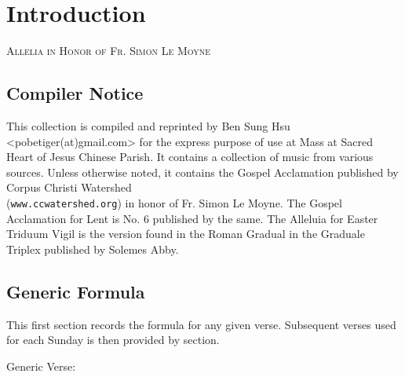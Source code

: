 \documentclass[11pt,oneside]{book} %
\begin{document}

\renewcommand*\contentsname{\textsc{Table of Contents}}
\tableofcontents


\mainmatter

\chapter{Introduction}
\begin{center}\begin{huge}
\textsc{Allelia in Honor of Fr. Simon Le Moyne}
\end{huge}\end{center}

\section{Compiler Notice}
\begin{paragraph}
This collection is compiled and reprinted by Ben Sung Hsu
<pobetiger(at)gmail.com> for the express purpose of use at 
Mass at Sacred Heart of Jesus Chinese Parish. It contains a collection
of music from various sources. Unless otherwise noted, it contains
the Gospel Acclamation published by Corpus Christi Watershed \\
(\texttt{www.ccwatershed.org}) in honor of Fr. Simon Le Moyne. 
The Gospel Acclamation for Lent is No. 6 published by the same.
The Alleluia for Easter Triduum Vigil is the version found in the
Roman Gradual in the Graduale Triplex published by Solemes Abby.
\end{paragraph}

\section{Generic Formula}

\begin{paragraph}
This first section records the formula for any given verse. 
Subsequent verses used for each Sunday is then provided by section.
\end{paragraph}


\begin{paragraph}\noindent\begin{large}
Generic Verse:\\\\
\end{large}\end{paragraph}
\end{document}
